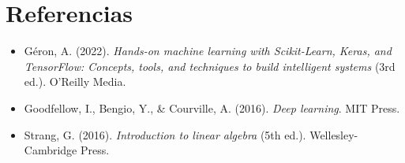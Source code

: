 \documentclass[11pt]{article}
\begin{document}
\section {Referencias}
\begin{itemize}
    \item[] Géron, A. (2022). \textit{Hands-on machine learning with Scikit-Learn, Keras, and TensorFlow: Concepts, tools, and techniques to build intelligent systems} (3rd ed.). O'Reilly Media.

    \item[] Goodfellow, I., Bengio, Y., \& Courville, A. (2016). \textit{Deep learning}. MIT Press.

    \item[] Strang, G. (2016). \textit{Introduction to linear algebra} (5th ed.). Wellesley-Cambridge Press.
\end{itemize}
\end{document}
